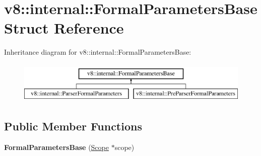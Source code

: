 \hypertarget{structv8_1_1internal_1_1_formal_parameters_base}{}\section{v8\+:\+:internal\+:\+:Formal\+Parameters\+Base Struct Reference}
\label{structv8_1_1internal_1_1_formal_parameters_base}
Inheritance diagram for v8\+:\+:internal\+:\+:Formal\+Parameters\+Base\+:\begin{figure}[H]
\begin{center}
\leavevmode
\includegraphics[height=2.000000cm]{structv8_1_1internal_1_1_formal_parameters_base}
\end{center}
\end{figure}
\subsection*{Public Member Functions}
\begin{DoxyCompactItemize}
\item 
{\bfseries Formal\+Parameters\+Base} (\hyperlink{classv8_1_1internal_1_1_scope}{Scope} $\ast$scope)\hypertarget{structv8_1_1internal_1_1_formal_parameters_base_a42edc3133dad8742db2d85e4d923e705}{}\label{structv8_1_1internal_1_1_formal_parameters_base_a42edc3133dad8742db2d85e4d923e705}

\end{DoxyCompactItemize}
